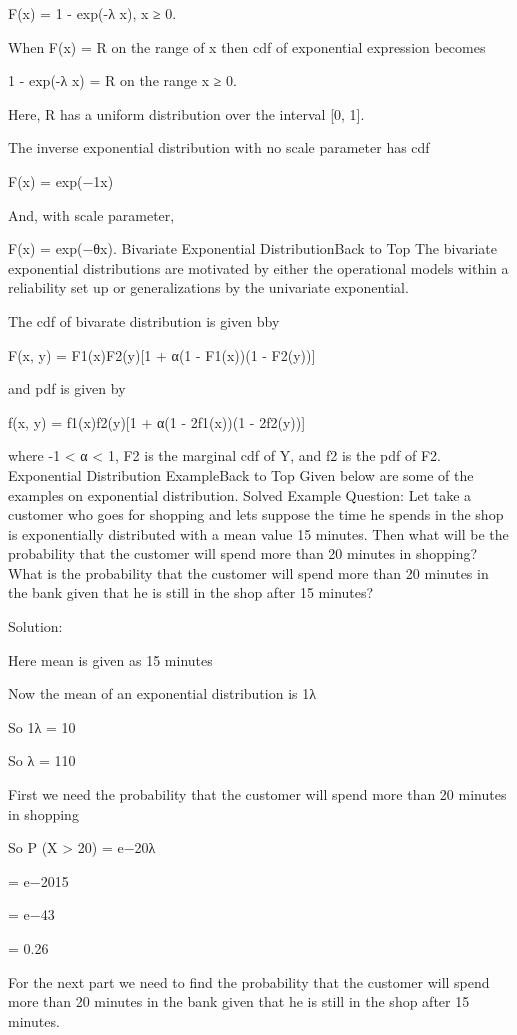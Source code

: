 \documentclass{beamer}
\begin{document}
	F(x) = 1 - exp(-λ x), x ≥ 0.
	
	When F(x) = R on the range of x then cdf of exponential expression becomes
	
	1 - exp(-λ x) = R on the range x ≥ 0.
	
	Here, R has a uniform distribution over the interval [0, 1].
	
	The inverse exponential distribution with no scale parameter has cdf
	
	F(x) = exp(−1x)
	
	And, with scale parameter,
	
	F(x) = exp(−θx).
	Bivariate Exponential DistributionBack to Top
	The bivariate exponential distributions are motivated by either the operational models within a reliability set up or generalizations by the univariate exponential.
	
	The cdf of bivarate distribution is given bby
	
	F(x, y) = F1(x)F2(y)[1 + α(1 - F1(x))(1 - F2(y))]
	
	and pdf is given by
	
	f(x, y) = f1(x)f2(y)[1 + α(1 - 2f1(x))(1 - 2f2(y))]
	
	where -1 < α < 1, F2 is the marginal cdf of Y, and f2 is the pdf of F2.
	Exponential Distribution ExampleBack to Top
	Given below are some of the examples on exponential distribution.
	Solved Example
	Question: Let take a customer who goes for shopping and lets suppose the time he spends in the shop is exponentially distributed with a mean value 15 minutes. Then what will be the probability that the customer will spend more than 20 minutes in shopping? What is the probability that the customer will spend more than 20 minutes in the bank given that he is still in the shop after 15 minutes?
	
	Solution:
	
	Here mean is given as 15 minutes
	
	Now the mean of an exponential distribution is 1λ
	
	So 1λ = 10
	
	So λ = 110
	
	First we need the probability that the customer will spend more than 20 minutes in shopping
	
	So P (X > 20) = e−20λ
	
	= e−2015 
	
	= e−43
	
	= 0.26
	
	For the next part we need to find the probability that the customer will spend more than 20 minutes in the bank given that he is still in the shop after 15 minutes.
	
\end{document}
